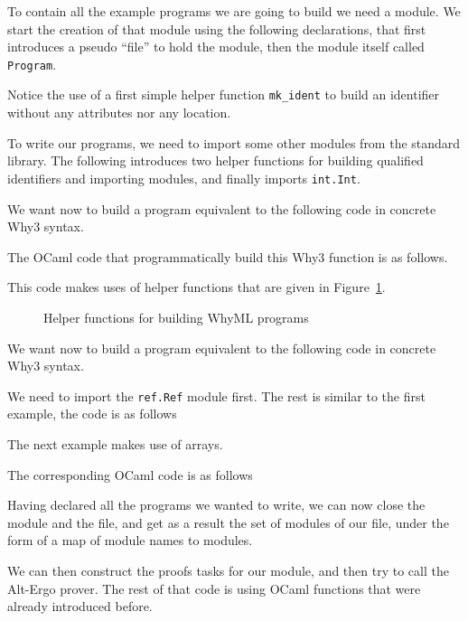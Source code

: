 To contain all the example programs we are going to build we need a
module. We start the creation of that module using the following
declarations, that first introduces a pseudo ``file'' to hold the
module, then the module itself called \verb|Program|.

Notice the use of a first
simple helper function \verb|mk_ident| to build an identifier without
any attributes nor any location.

To write our programs, we need to import some other modules from the
standard library. The following introduces two helper functions for
building qualified identifiers and importing modules, and finally
imports \verb|int.Int|.


We want now to build a program equivalent to the following code in concrete Why3 syntax.


The OCaml code that programmatically build this Why3 function is as follows.

This code makes uses of helper functions that are given in Figure~\ref{fig:helpers}.
\begin{figure}[t]
  
  \caption{Helper functions for building WhyML programs}
  \label{fig:helpers}
\end{figure}

We want now to build a program equivalent to the following code in concrete Why3 syntax.

We need to import the \verb|ref.Ref| module first. The rest is similar to the first example, the code is as follows


The next example makes use of arrays.

The corresponding OCaml code is as follows


Having declared all the programs we wanted to write, we can now close
the module and the file, and get as a result the set of modules of our
file, under the form of a map of module names to modules.


We can then construct the proofs tasks for our module, and then try to
call the Alt-Ergo prover. The rest of that code is using OCaml
functions that were already introduced before.


